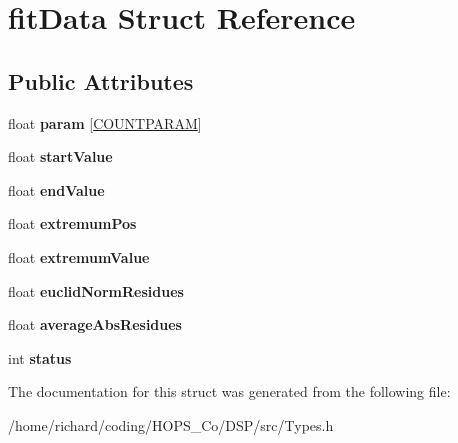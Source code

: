 \hypertarget{structfitData}{\section{fit\-Data Struct Reference}
\label{structfitData}
}
\subsection*{Public Attributes}
\begin{DoxyCompactItemize}
\item 
\hypertarget{structfitData_a9dc59837acfda1ff57f3c8c450c4b34f}{float {\bfseries param} \mbox{[}\hyperlink{Constants_8h_a0df66aec82cc118ec8978ce882abea1c}{C\-O\-U\-N\-T\-P\-A\-R\-A\-M}\mbox{]}}\label{structfitData_a9dc59837acfda1ff57f3c8c450c4b34f}

\item 
\hypertarget{structfitData_a43ca55a48f87d4ee4b56b967f42b2d20}{float {\bfseries start\-Value}}\label{structfitData_a43ca55a48f87d4ee4b56b967f42b2d20}

\item 
\hypertarget{structfitData_a5378631adb5adbf16fce978a23ee274e}{float {\bfseries end\-Value}}\label{structfitData_a5378631adb5adbf16fce978a23ee274e}

\item 
\hypertarget{structfitData_a49e033dcf62bab8507d9c48944f12ec3}{float {\bfseries extremum\-Pos}}\label{structfitData_a49e033dcf62bab8507d9c48944f12ec3}

\item 
\hypertarget{structfitData_a496cb36cda36d83a894b0862ad9197ce}{float {\bfseries extremum\-Value}}\label{structfitData_a496cb36cda36d83a894b0862ad9197ce}

\item 
\hypertarget{structfitData_ac3410d59c7f6fe2c1b646ebc54ca050c}{float {\bfseries euclid\-Norm\-Residues}}\label{structfitData_ac3410d59c7f6fe2c1b646ebc54ca050c}

\item 
\hypertarget{structfitData_af9ce188fcd02cb73d523cc21b5570f51}{float {\bfseries average\-Abs\-Residues}}\label{structfitData_af9ce188fcd02cb73d523cc21b5570f51}

\item 
\hypertarget{structfitData_a3da54e3b439a7153caf422556b57686e}{int {\bfseries status}}\label{structfitData_a3da54e3b439a7153caf422556b57686e}

\end{DoxyCompactItemize}


The documentation for this struct was generated from the following file\-:\begin{DoxyCompactItemize}
\item 
/home/richard/coding/\-H\-O\-P\-S\-\_\-\-Co/\-D\-S\-P/src/Types.\-h\end{DoxyCompactItemize}
